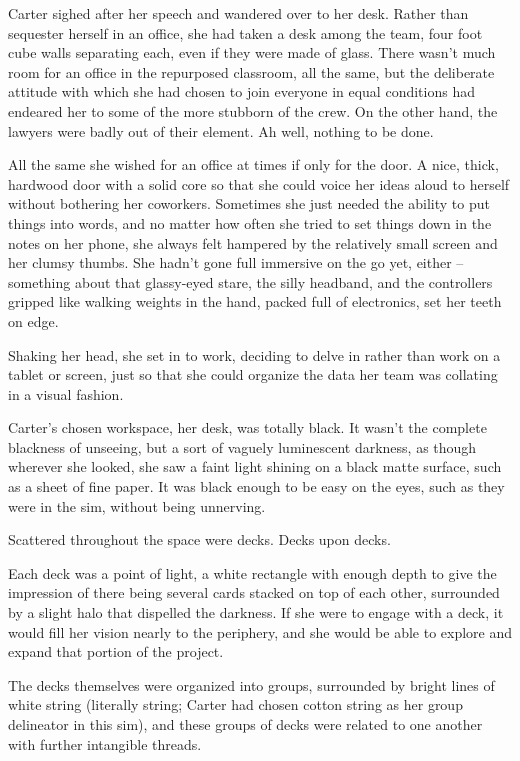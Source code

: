 Carter sighed after her speech and wandered over to her desk.  Rather than sequester herself in an office, she had taken a desk among the team, four foot cube walls separating each, even if they were made of glass.  There wasn't much room for an office in the repurposed classroom, all the same, but the deliberate attitude with which she had chosen to join everyone in equal conditions had endeared her to some of the more stubborn of the crew.  On the other hand, the lawyers were badly out of their element.  Ah well, nothing to be done.

All the same she wished for an office at times if only for the door.  A nice, thick, hardwood door with a solid core so that she could voice her ideas aloud to herself without bothering her coworkers.  Sometimes she just needed the ability to put things into words, and no matter how often she tried to set things down in the notes on her phone, she always felt hampered by the relatively small screen and her clumsy thumbs.  She hadn't gone full immersive on the go yet, either -- something about that glassy-eyed stare, the silly headband, and the controllers gripped like walking weights in the hand, packed full of electronics, set her teeth on edge.

Shaking her head, she set in to work, deciding to delve in rather than work on a tablet or screen, just so that she could organize the data her team was collating in a visual fashion.

Carter's chosen workspace, her desk, was totally black.  It wasn't the complete blackness of unseeing, but a sort of vaguely luminescent darkness, as though wherever she looked, she saw a faint light shining on a black matte surface, such as a sheet of fine paper.  It was black enough to be easy on the eyes, such as they were in the sim, without being unnerving.

Scattered throughout the space were decks.  Decks upon decks.

Each deck was a point of light, a white rectangle with enough depth to give the impression of there being several cards stacked on top of each other, surrounded by a slight halo that dispelled the darkness.  If she were to engage with a deck, it would fill her vision nearly to the periphery, and she would be able to explore and expand that portion of the project.

The decks themselves were organized into groups, surrounded by bright lines of white string (literally string; Carter had chosen cotton string as her group delineator in this sim), and these groups of decks were related to one another with further intangible threads.


